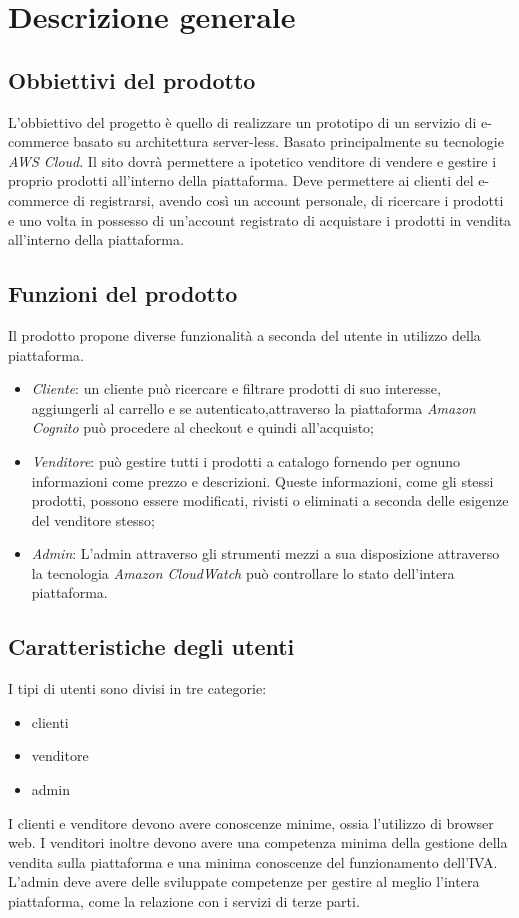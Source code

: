 \section{Descrizione generale}
\subsection{Obbiettivi del prodotto}
L'obbiettivo del progetto è quello di realizzare un prototipo di un servizio di e-commerce basato su architettura server-less. Basato principalmente su tecnologie \textit{AWS Cloud}. Il sito dovrà permettere a ipotetico venditore di vendere e gestire i proprio prodotti all'interno della piattaforma. Deve permettere ai clienti del e-commerce di registrarsi, avendo così un account personale, di ricercare i prodotti e uno volta in possesso di un'account registrato di acquistare i prodotti in vendita all'interno della piattaforma.
\subsection{Funzioni del prodotto}
Il prodotto propone diverse funzionalità a seconda del utente in utilizzo della piattaforma.
\begin{itemize}
    \item \textit{Cliente}: un cliente può ricercare e filtrare prodotti di suo interesse, aggiungerli al carrello e se autenticato,attraverso la piattaforma \textit{Amazon Cognito} può procedere al checkout e quindi all'acquisto;
    \item \textit{Venditore}: può gestire tutti i prodotti a catalogo fornendo per ognuno informazioni come prezzo e descrizioni. Queste informazioni, come gli stessi prodotti, possono essere modificati, rivisti o eliminati a seconda delle esigenze del venditore stesso;
    \item \textit{Admin}: L'admin attraverso gli strumenti mezzi a sua disposizione attraverso la tecnologia \textit{Amazon CloudWatch} può controllare lo stato dell'intera piattaforma.
\end{itemize}
\subsection{Caratteristiche degli utenti}
I tipi di utenti sono divisi in tre categorie:
\begin{itemize}
    \item clienti
    \item venditore
    \item admin
\end{itemize}
I clienti e venditore devono avere conoscenze minime, ossia l'utilizzo di browser  web. I venditori inoltre devono avere una competenza minima della gestione della vendita sulla piattaforma e una minima conoscenze del funzionamento dell'IVA. L'admin deve avere delle sviluppate competenze per gestire al meglio l'intera piattaforma, come la relazione con i servizi di terze parti.

